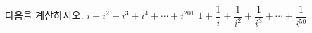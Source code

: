 다음을 계산하시오.
 $i+i^2+i^3+i^4+\cdots+i^{201}$
 $1+\dfrac{1}{i}+\dfrac{1}{i^2}+\dfrac{1}{i^3}+\cdots+\dfrac{1}{i^{50}}$

